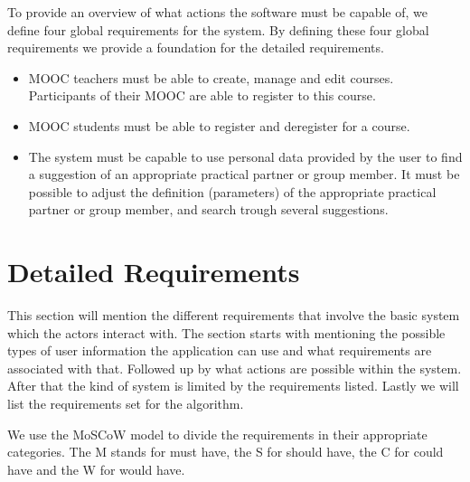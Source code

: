 To provide an overview of what actions the software must be capable of, we define four global requirements for the system.
By defining these four global requirements we provide a foundation for the detailed requirements.
\begin{itemize}
\item MOOC teachers must be able to create, manage and edit courses.
Participants of their MOOC are able to register to this course.

\item MOOC students must be able to register and deregister for a course.

\item The system must be capable to use personal data provided by the user to find a suggestion of an appropriate practical partner or group member.
It must be possible to adjust the definition (parameters) of the appropriate practical partner or group member, and search trough several suggestions.
\end{itemize}

\section{Detailed Requirements}
This section will mention the different requirements that involve the basic system which the actors interact with.
The section starts with mentioning the possible types of user information the application can use and what requirements are associated with that.
Followed up by what actions are possible within the system.
After that the kind of system is limited by the requirements listed.
Lastly we will list the requirements set for the algorithm.

We use the MoSCoW model to divide the requirements in their appropriate categories.
The M stands for must have, the S for should have, the C for could have and the W for would have.

